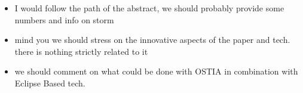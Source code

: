 \begin{itemize}
\item I would follow the path of the abstract, we should probably provide some numbers and info on storm
\item mind you we should stress on the innovative aspects of the paper and tech. there is nothing strictly related to it
\item we should comment on what could be done with OSTIA in combination with Eclipse Based tech.
\end{itemize}